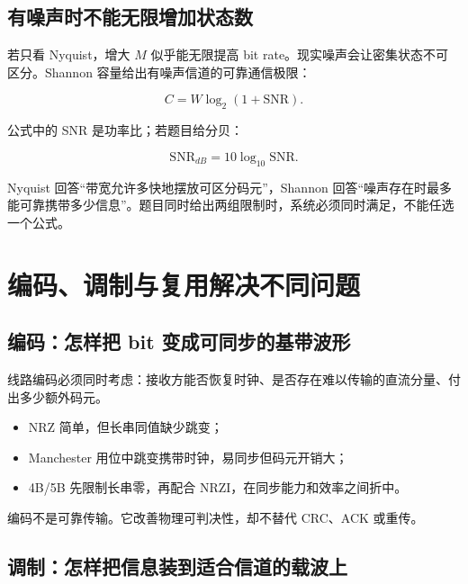 \documentclass[UTF8,fontset=none,11pt,a4paper]{ctexart}
\providecommand{\tightlist}{\setlength{\itemsep}{0pt}\setlength{\parskip}{0pt}}
\begin{document}
\subsection{有噪声时不能无限增加状态数}\label{32-ux6709ux566aux58f0ux65f6ux4e0dux80fdux65e0ux9650ux589eux52a0ux72b6ux6001ux6570}

若只看 Nyquist，增大 \(M\) 似乎能无限提高 bit
rate。现实噪声会让密集状态不可区分。Shannon
容量给出有噪声信道的可靠通信极限：

\[
C=W\log_2(1+\mathrm{SNR}).
\]

公式中的 SNR 是功率比；若题目给分贝：

\[
\mathrm{SNR}_{dB}=10\log_{10}\mathrm{SNR}.
\]

Nyquist 回答``带宽允许多快地摆放可区分码元''，Shannon
回答``噪声存在时最多能可靠携带多少信息''。题目同时给出两组限制时，系统必须同时满足，不能任选一个公式。

\section{编码、调制与复用解决不同问题}\label{4-ux7f16ux7801ux8c03ux5236ux4e0eux590dux7528ux89e3ux51b3ux4e0dux540cux95eeux9898}

\subsection{编码：怎样把 bit
变成可同步的基带波形}\label{41-ux7f16ux7801ux600eux6837ux628a-bit-ux53d8ux6210ux53efux540cux6b65ux7684ux57faux5e26ux6ce2ux5f62}

线路编码必须同时考虑：接收方能否恢复时钟、是否存在难以传输的直流分量、付出多少额外码元。

\begin{itemize}
\tightlist
\item
  NRZ 简单，但长串同值缺少跳变；
\item
  Manchester 用位中跳变携带时钟，易同步但码元开销大；
\item
  4B/5B 先限制长串零，再配合 NRZI，在同步能力和效率之间折中。
\end{itemize}

编码不是可靠传输。它改善物理可判决性，却不替代 CRC、ACK 或重传。

\subsection{调制：怎样把信息装到适合信道的载波上}\label{42-ux8c03ux5236ux600eux6837ux628aux4fe1ux606fux88c5ux5230ux9002ux5408ux4fe1ux9053ux7684ux8f7dux6ce2ux4e0a}
\end{document}
